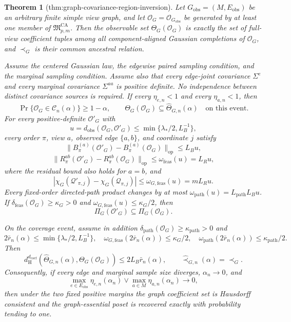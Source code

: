 \documentclass{article}
\newtheorem{theorem}{Theorem}
\begin{document}
\begin{theorem}[thm:graph-covariance-region-inversion]\label{thm:graph-covariance-region-inversion}
Let \(G_{\mathrm{obs}}=(M,E_{\mathrm{obs}})\) be an arbitrary finite simple view graph, and let \(\mathcal O_G=\mathcal O_{G_{\mathrm{obs}}}\) be generated by at least one member of \(\mathfrak M_{p,m}^{\mathrm{CA}}\).  Then the observable set \(\Theta_G(\mathcal O_G)\) is exactly the set of full-view coefficient tuples among all component-aligned Gaussian completions of \(\mathcal O_G\), and \(\prec_G\) is their common ancestral relation.

Assume the centered Gaussian law, the edgewise paired sampling condition, and the marginal sampling condition.  Assume also that every edge-joint covariance \(\Sigma^e\) and every marginal covariance \(\Sigma^{aa}\) is positive definite.  No independence between distinct covariance sources is required.  If every \(\eta_{e,n}<1\) and every \(\eta_{a,n}<1\), then
\[
\Pr\{\mathcal O_G\in\mathcal C_n(\alpha)\}\ge1-\alpha,
\qquad
\Theta_G(\mathcal O_G)\subseteq\widehat\Theta_{G,n}(\alpha)
\quad\text{on this event}.
\]
For every positive-definite \(\mathcal O'_G\) with
\[
u=d_{\mathrm{obs}}(\mathcal O_G,\mathcal O'_G)
\le\min\{\lambda_*/2,L_B^{-1}\},
\]
every order \(\pi\), view \(a\), observed edge \(\{a,b\}\), and coordinate \(j\) satisfy
\[
\|B_\pi^{(a)}(\mathcal O'_G)-B_\pi^{(a)}(\mathcal O_G)\|_{\mathrm{op}}\le L_Bu,
\]
\[
\|R_\pi^{ab}(\mathcal O'_G)-R_\pi^{ab}(\mathcal O_G)\|_{\mathrm{op}}
\le\omega_{\mathrm{feas}}(u)=L_Ru,
\]
where the residual bound also holds for \(a=b\), and
\[
|\chi_G(\mathcal Q'_{\pi,j})-\chi_G(\mathcal Q_{\pi,j})|
\le\omega_{G,\mathrm{feas}}(u)=mL_Ru.
\]
Every fixed-order directed-path product changes by at most \(\omega_{\mathrm{path}}(u)=L_{\mathrm{path}}L_Bu\).  If \(\delta_{\mathrm{feas}}(\mathcal O_G)\ge\kappa_G>0\) and \(\omega_{G,\mathrm{feas}}(u)\le\kappa_G/2\), then
\[
\Pi_G(\mathcal O'_G)\subseteq\Pi_G(\mathcal O_G).
\]

On the coverage event, assume in addition \(\delta_{\mathrm{path}}(\mathcal O_G)\ge\kappa_{\mathrm{path}}>0\) and
\[
2\bar r_n(\alpha)\le\min\{\lambda_*/2,L_B^{-1}\},
\quad
\omega_{G,\mathrm{feas}}(2\bar r_n(\alpha))\le\kappa_G/2,
\quad
\omega_{\mathrm{path}}(2\bar r_n(\alpha))\le\kappa_{\mathrm{path}}/2.
\]
Then
\[
d_{\mathrm H}^{d_{\mathrm{coef}}}
(\widehat\Theta_{G,n}(\alpha),\Theta_G(\mathcal O_G))
\le2L_B\bar r_n(\alpha),
\qquad
\widehat\prec_{G,n}(\alpha)=\prec_G.
\]
Consequently, if every edge and marginal sample size diverges, \(\alpha_n\to0\), and
\[
\max_{e\in E_{\mathrm{obs}}}\eta_{e,n}(\alpha_n)
\vee\max_{a\in M}\eta_{a,n}(\alpha_n)\longrightarrow0,
\]
then under the two fixed positive margins the graph coefficient set is Hausdorff consistent and the graph-essential poset is recovered exactly with probability tending to one.
\end{theorem}
\end{document}
